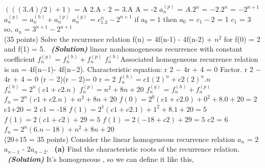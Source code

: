 \documentclass[a4 paper]{article}
\numberwithin{equation}{section}
\newcommand{\problem}[2]{~\\\fbox{\textbf{Problem #1}}\hfill (#2 points)\newline\newline}
\newcommand{\subproblem}[1]{~\newline\textbf{(#1)}}
\newcommand{\solution}{~\newline\textbf{\textit{(Solution)}} }
\newcommand{\0}{\mathbf{0}}
\begin{document}
$(((3.A)/2)+1)$ = A
\newline
2.A - 2 = 3.A
\newline
A = -2
\newline
$a_n^{(p)}$ = $A.2^n$ = $-2.2^n$ = $-2^{n+1}$
\newline
$a_n^{(g)}$ = $a_n^{(h)} + a_n^{(p)}$
\newline
$a_n^{(g)}$ = $c_1.3^n-2^{n+1}$
\newline
if $a_0 = 1$ then $a_0$ = $c_1-2$ = 1
\newline
$c_1$ = 3 so,
\newline
$a_n$ = $3^{n+1}-2^{n+1}$
\newline
\problem{2}{35}
Solve the recurrence relation f(n) = 4f(n-1) - 4f(n-2) + $n^2$ for f(0) = 2 and f(1) = 5. 
\solution
\newline
linear nonhomogeneous recurrence with constant coefficient
\newline
$f_n^{(g)}$ = $f_n^{(h)} + f_n^{(p)}$
\newline
$f_n^{(h)}$Associated homogeneous recurrence relation is an = 4f(n−1)- 4f(n−2). 
\newline
Characteristic equation: r 2 − 4r + 4 = 0  Factor. r 2 − 4r + 4 = 0
\newline 
(r − 2)(r − 2)= 0 r = 2
\newline
$f_n^{(h)} =c1(2)^{n}+ c2(2)^{n}.n$
\newline
$f_n^{(h)} =2^{n}(c1+c2.n)$
\newline
$f_n^{(p)} =n^{2}+8n+20$
\newline
$f_n^{(g)}$ = $f_n^{(h)} + f_n^{(p)}$
\newline
$f_n =2^{n}( c1+ c2.n) +n^{2}+8n+20 $
\newline
$f(0) =2^{0}( c1+ c2.0) +0^{2}+8.0+20 = 2 $
\newline
c1+20 = 2
\newline
c1 = -18
 \newline
$f(1) =2^{1}( c1+ c2.1) +1^{2}+8.1+20  = 5$
 \newline
 $f(1) =2(c1 +c2)+29  = 5 $
 \newline
  $f(1) =2(-18 +c2)+29  = 5 $
  \newline
  c2 = 6
\newline
$f_n =2^{n}( 6.n - 18) +n^{2}+8n+20 $
\newpage
\problem{3}{20+15 = 35}
Consider the linear homogeneous recurrence relation $a_n$ = 2$a_{n-1}$ - 2$a_{n-2}$.
\subproblem{a} Find the characteristic roots of the recurrence relation.
\solution
\newline
It's homogeneous , so we can define it like this,
\end{document}

